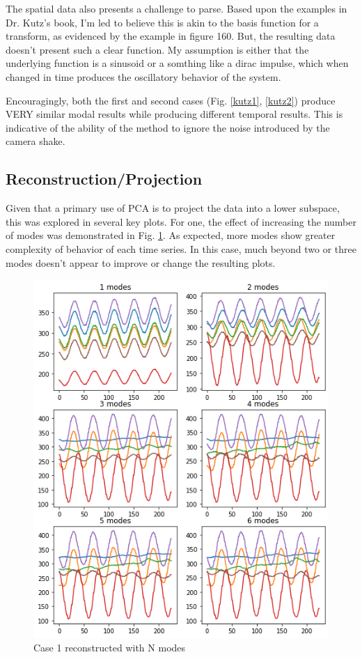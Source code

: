 \documentclass[journal]{IEEEtran}
\begin{document}
The spatial data also presents a challenge to parse. Based upon the examples in Dr. Kutz's book, I'm led to believe this is akin to the basis function for a transform, as evidenced by the example in figure 160. But, the resulting data doesn't present such a clear function. My assumption is either that the underlying function is a sinusoid or a somthing like a dirac impulse, which when changed in time produces the oscillatory behavior of the system.

Encouragingly, both the first and second cases (Fig. \ref{kutz1}, \ref{kutz2}) produce VERY similar modal results while producing different temporal results. This is indicative of the ability of the method to ignore the noise introduced by the camera shake.

\subsection{Reconstruction/Projection}
Given that a primary use of PCA is to project the data into a lower subspace, this was explored in several key plots. For one, the effect of increasing the number of modes was demonstrated in Fig. \ref{changing_recon}. As expected, more modes show greater complexity of behavior of each time series. In this case, much beyond two or three modes doesn't appear to improve or change the resulting plots.
\begin{figure}
	\centerline{\includegraphics[width=\columnwidth]{changing_recon.png}}
	\caption{Case 1 reconstructed with N modes}
	\label{changing_recon}
\end{figure}
\end{document}
